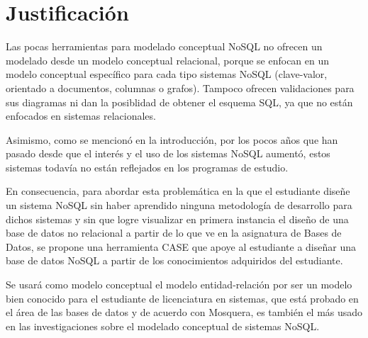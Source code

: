 \section{Justificación}

Las pocas herramientas para modelado conceptual NoSQL no ofrecen un modelado desde un modelo conceptual relacional, porque se enfocan en un modelo conceptual específico para cada tipo sistemas NoSQL (clave-valor, orientado a documentos, columnas o grafos). Tampoco ofrecen validaciones para sus diagramas ni dan la posiblidad de obtener el esquema SQL, ya que no están enfocados en sistemas relacionales.


Asimismo, como se mencionó en la introducción, por los pocos años que han pasado desde que el interés y el uso de los sistemas NoSQL aumentó, estos sistemas todavía no están reflejados en los programas de estudio.


En consecuencia, para abordar esta problemática en la que el estudiante diseñe un sistema NoSQL sin haber aprendido ninguna metodología de desarrollo para dichos sistemas y sin que logre visualizar en primera instancia el diseño de una base de datos no relacional a partir de lo que ve en la asignatura de Bases de Datos, se propone una herramienta CASE que apoye al estudiante a diseñar una base de datos NoSQL a partir de los conocimientos adquiridos del estudiante.


Se usará como modelo conceptual el modelo entidad-relación por ser un modelo bien conocido para el estudiante de licenciatura en sistemas, que está probado en el área de las bases de datos y de acuerdo con Mosquera\cite{martinez-mosquera_modeling_2020}, es también el más usado en las investigaciones sobre el modelado conceptual de sistemas NoSQL.



